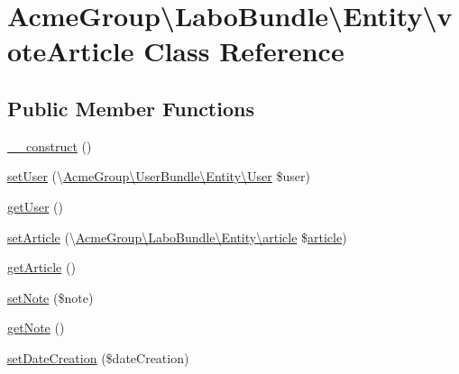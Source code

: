 \hypertarget{class_acme_group_1_1_labo_bundle_1_1_entity_1_1vote_article}{\section{Acme\+Group\textbackslash{}Labo\+Bundle\textbackslash{}Entity\textbackslash{}vote\+Article Class Reference}
\label{class_acme_group_1_1_labo_bundle_1_1_entity_1_1vote_article}
}
\subsection*{Public Member Functions}
\begin{DoxyCompactItemize}
\item 
\hyperlink{class_acme_group_1_1_labo_bundle_1_1_entity_1_1vote_article_a9b2c8f0f67652c4b5ba88689ad1c4a20}{\+\_\+\+\_\+construct} ()
\item 
\hyperlink{class_acme_group_1_1_labo_bundle_1_1_entity_1_1vote_article_a4ca3ff4dcd72d0096bb3ab97b1ddc76a}{set\+User} (\textbackslash{}\hyperlink{class_acme_group_1_1_user_bundle_1_1_entity_1_1_user}{Acme\+Group\textbackslash{}\+User\+Bundle\textbackslash{}\+Entity\textbackslash{}\+User} \$user)
\item 
\hyperlink{class_acme_group_1_1_labo_bundle_1_1_entity_1_1vote_article_a7da7b766e46d006843c1f29a167ad858}{get\+User} ()
\item 
\hyperlink{class_acme_group_1_1_labo_bundle_1_1_entity_1_1vote_article_a09e7aac45ded6be071d2e2c7a7667488}{set\+Article} (\textbackslash{}\hyperlink{class_acme_group_1_1_labo_bundle_1_1_entity_1_1article}{Acme\+Group\textbackslash{}\+Labo\+Bundle\textbackslash{}\+Entity\textbackslash{}article} \$\hyperlink{class_acme_group_1_1_labo_bundle_1_1_entity_1_1article}{article})
\item 
\hyperlink{class_acme_group_1_1_labo_bundle_1_1_entity_1_1vote_article_aea7a4890290b25cef458bf3cdcfa3bf0}{get\+Article} ()
\item 
\hyperlink{class_acme_group_1_1_labo_bundle_1_1_entity_1_1vote_article_ac6cfc209a3fb5b4baf350bb9a79ba37e}{set\+Note} (\$note)
\item 
\hyperlink{class_acme_group_1_1_labo_bundle_1_1_entity_1_1vote_article_a51faade60edd71bf67cd7d98295612bf}{get\+Note} ()
\item 
\hyperlink{class_acme_group_1_1_labo_bundle_1_1_entity_1_1vote_article_ac09ebf1c15fe25eaa32b3f3ac5a3413b}{set\+Date\+Creation} (\$date\+Creation)

\end{DoxyCompactItemize}
